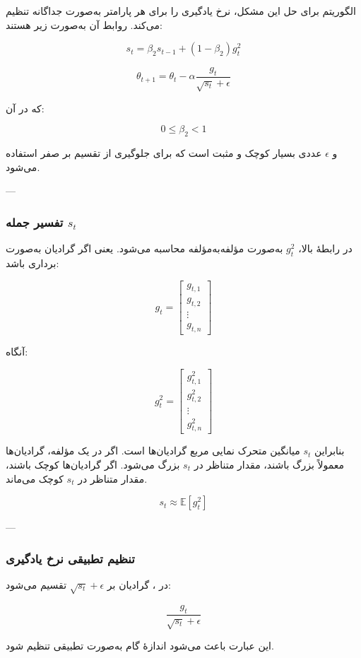 \documentclass[12pt,a4paper]{article}
\begin{document}
الگوریتم  برای حل این مشکل، نرخ یادگیری را برای هر پارامتر به‌صورت جداگانه تنظیم می‌کند. روابط آن به‌صورت زیر هستند:

\[
s_t = \beta_2 s_{t-1} + (1-\beta_2)g_t^2
\]

\[
\theta_{t+1}=\theta_t-\alpha \frac{g_t}{\sqrt{s_t}+\epsilon}
\]

که در آن:

\[
0 \leq \beta_2 < 1
\]

و \(\epsilon\) عددی بسیار کوچک و مثبت است که برای جلوگیری از تقسیم بر صفر استفاده می‌شود.

---

\subsubsection{تفسیر جمله \texorpdfstring{$s_t$}{st}}

در رابطهٔ بالا، \(g_t^2\) به‌صورت مؤلفه‌به‌مؤلفه محاسبه می‌شود. یعنی اگر گرادیان به‌صورت برداری باشد:

\[
g_t =
\begin{bmatrix}
	g_{t,1}\\
	g_{t,2}\\
	\vdots\\
	g_{t,n}
\end{bmatrix}
\]

آنگاه:

\[
g_t^2 =
\begin{bmatrix}
	g_{t,1}^2\\
	g_{t,2}^2\\
	\vdots\\
	g_{t,n}^2
\end{bmatrix}
\]

بنابراین \(s_t\) میانگین متحرک نمایی مربع گرادیان‌ها است. اگر در یک مؤلفه، گرادیان‌ها معمولاً بزرگ باشند، مقدار متناظر در \(s_t\) بزرگ می‌شود. اگر گرادیان‌ها کوچک باشند، مقدار متناظر در \(s_t\) کوچک می‌ماند.

\[
s_t \approx \mathbb{E}[g_t^2]
\]

---

\subsubsection{تنظیم تطبیقی نرخ یادگیری}

در ، گرادیان بر \(\sqrt{s_t}+\epsilon\) تقسیم می‌شود:

\[
\frac{g_t}{\sqrt{s_t}+\epsilon}
\]

این عبارت باعث می‌شود اندازهٔ گام به‌صورت تطبیقی تنظیم شود.
\end{document}
